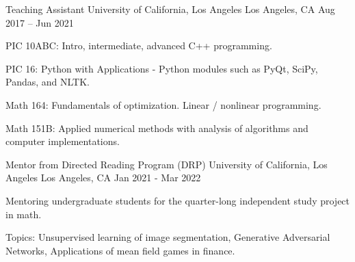 

\begin{cventries}

  \cventry
    {Teaching Assistant} %
    {University of California, Los Angeles} %
    {Los Angeles, CA} %
    {Aug 2017 – Jun 2021} %
    {
      \begin{cvitems} %
        \item {PIC 10ABC: Intro, intermediate, advanced C++ programming.}
        \item {PIC 16: Python with Applications} - Python modules such as PyQt, SciPy, Pandas, and NLTK.
        \item {Math 164: Fundamentals of optimization. Linear / nonlinear programming}.
        \item {Math 151B: Applied numerical methods with analysis of algorithms and computer implementations}.
      \end{cvitems}
    }

  \cventry
    {Mentor from Directed Reading Program (DRP)} %
    {University of California, Los Angeles} %
    {Los Angeles, CA} %
    {Jan 2021 - Mar 2022} %
    {
      \begin{cvitems} %
        \item Mentoring undergraduate students for the quarter-long independent study project in math.
        \item Topics: Unsupervised learning of image segmentation, Generative Adversarial Networks, Applications of mean field games in finance.
      \end{cvitems}
    }

\end{cventries}
